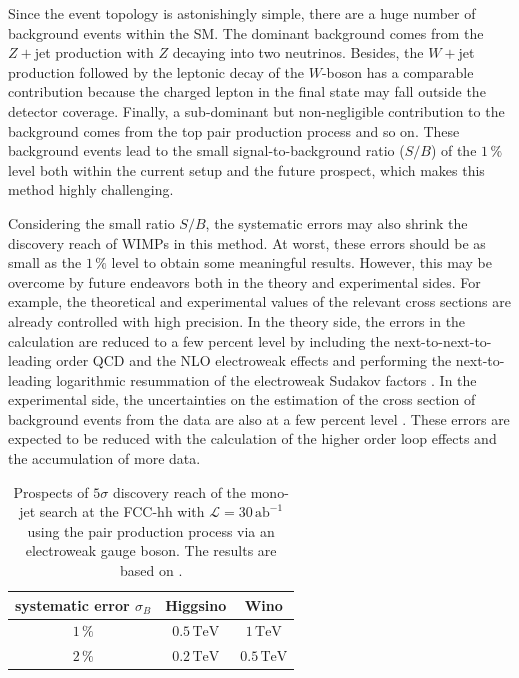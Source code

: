 \documentclass[12pt,twoside,book]{article}
\begin{document}
Since the event topology is astonishingly simple, there are a huge number of background events within the SM.
The dominant background comes from the $Z +$jet production with $Z$ decaying into two neutrinos.
Besides, the $W+$jet production followed by the leptonic decay of the $W$-boson has a comparable contribution because the charged lepton in the final state may fall outside the detector coverage.
Finally, a sub-dominant but non-negligible contribution to the background comes from the top pair production process and so on.
These background events lead to the small signal-to-background ratio ($S/B$) of the $1\, \%$ level both within the current setup and the future prospect, which makes this method highly challenging.

Considering the small ratio $S/B$, the systematic errors may also shrink the discovery reach of WIMPs in this method.
At worst, these errors should be as small as the $1\, \%$ level to obtain some meaningful results.
However, this may be overcome by future endeavors both in the theory and experimental sides.
For example, the theoretical and experimental values of the relevant cross sections are already controlled with high precision.
In the theory side, the errors in the calculation are reduced to a few percent level by including the next-to-next-to-leading order QCD and the NLO electroweak effects and performing the next-to-leading logarithmic resummation of the electroweak Sudakov factors \cite{Lindert:2017olm}.
In the experimental side, the uncertainties on the estimation of the cross section of background events from the data are also at a few percent level \cite{Aaboud:2017phn}.
These errors are expected to be reduced with the calculation of the higher order loop effects and the accumulation of more data.

\begin{table}[t]
  \centering
  \begin{tabular}{c|cc}
    systematic error $\sigma_B$ & Higgsino & Wino\\ \hline
    $1\, \%$ & $0.5\, \mathrm{TeV}$ & $1\,\mathrm{TeV}$ \\
    $2\, \%$ & $0.2\, \mathrm{TeV}$ & $0.5\,\mathrm{TeV}$ \\
  \end{tabular}
  \caption{
    Prospects of $5\sigma$ discovery reach of the mono-jet search at the FCC-hh with $\mathcal{L} = 30\,\mathrm{ab}^{-1}$ using the pair production process via an electroweak gauge boson.
    The results are based on \cite{Han:2018wus}.
  }
  \label{tab:mono-jet}
\end{table}
\end{document}
